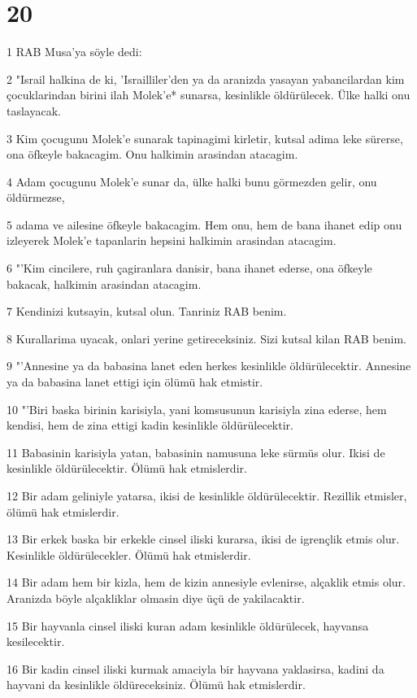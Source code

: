 \chapter{20}

\par 1 RAB Musa'ya söyle dedi:
\par 2 "Israil halkina de ki, 'Israilliler'den ya da aranizda yasayan yabancilardan kim çocuklarindan birini ilah Molek'e* sunarsa, kesinlikle öldürülecek. Ülke halki onu taslayacak.
\par 3 Kim çocugunu Molek'e sunarak tapinagimi kirletir, kutsal adima leke sürerse, ona öfkeyle bakacagim. Onu halkimin arasindan atacagim.
\par 4 Adam çocugunu Molek'e sunar da, ülke halki bunu görmezden gelir, onu öldürmezse,
\par 5 adama ve ailesine öfkeyle bakacagim. Hem onu, hem de bana ihanet edip onu izleyerek Molek'e tapanlarin hepsini halkimin arasindan atacagim.
\par 6 "'Kim cincilere, ruh çagiranlara danisir, bana ihanet ederse, ona öfkeyle bakacak, halkimin arasindan atacagim.
\par 7 Kendinizi kutsayin, kutsal olun. Tanriniz RAB benim.
\par 8 Kurallarima uyacak, onlari yerine getireceksiniz. Sizi kutsal kilan RAB benim.
\par 9 "'Annesine ya da babasina lanet eden herkes kesinlikle öldürülecektir. Annesine ya da babasina lanet ettigi için ölümü hak etmistir.
\par 10 "'Biri baska birinin karisiyla, yani komsusunun karisiyla zina ederse, hem kendisi, hem de zina ettigi kadin kesinlikle öldürülecektir.
\par 11 Babasinin karisiyla yatan, babasinin namusuna leke sürmüs olur. Ikisi de kesinlikle öldürülecektir. Ölümü hak etmislerdir.
\par 12 Bir adam geliniyle yatarsa, ikisi de kesinlikle öldürülecektir. Rezillik etmisler, ölümü hak etmislerdir.
\par 13 Bir erkek baska bir erkekle cinsel iliski kurarsa, ikisi de igrençlik etmis olur. Kesinlikle öldürülecekler. Ölümü hak etmislerdir.
\par 14 Bir adam hem bir kizla, hem de kizin annesiyle evlenirse, alçaklik etmis olur. Aranizda böyle alçakliklar olmasin diye üçü de yakilacaktir.
\par 15 Bir hayvanla cinsel iliski kuran adam kesinlikle öldürülecek, hayvansa kesilecektir.
\par 16 Bir kadin cinsel iliski kurmak amaciyla bir hayvana yaklasirsa, kadini da hayvani da kesinlikle öldüreceksiniz. Ölümü hak etmislerdir.
